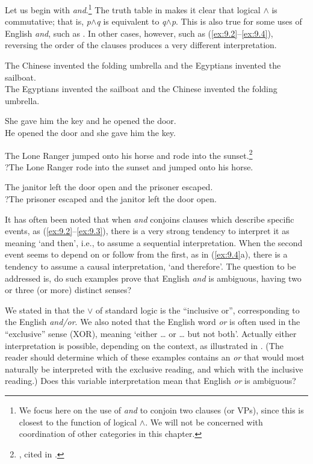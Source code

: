 Let us begin with \textit{and}.\footnote{We focus here on the use of \textit{and} to conjoin two clauses (or VPs), since this is closest to the function of logical $\wedge$. We will not be concerned with coordination of other categories in this chapter.} The truth table in  makes it clear that logical $\wedge$ is commutative; that is, \textit{p$\wedge$}\textit{q} is equivalent to \textit{q$\wedge$}\textit{p}. This is also true for some uses of English \textit{and}, such as . In other cases, however, such as (\ref{ex:9.2}--\ref{ex:9.4}), reversing the order of the clauses produces a very different interpretation.


\ea \label{ex:9.1}
\ea The {Chinese} invented the folding umbrella and the Egyptians invented the sailboat.\\
\ex The Egyptians invented the sailboat and the {Chinese} invented the folding umbrella.
                       \z
\z

\ea \label{ex:9.2}
\ea She gave him the key and he opened the door.\\
\ex He opened the door and she gave him the key.
                       \z
\z

\ea \label{ex:9.3}
\ea The Lone Ranger jumped onto his horse and rode into the sunset.\footnote{\citet[56]{Kempson1975}, cited in \citet{Gazdar1979}.}\\
\ex ?The Lone Ranger rode into the sunset and jumped onto his horse.
                       \z
\z

\ea \label{ex:9.4}
\ea The janitor left the door open and the prisoner escaped.\\
\ex ?The prisoner escaped and the janitor left the door open.
                       \z
\z


It has often been noted that when \textit{and} conjoins clauses which describe specific events, as (\ref{ex:9.2}--\ref{ex:9.3}), there is a very strong tendency to interpret it as meaning ‘and then’, i.e., to assume a sequential interpretation. When the second event seems to depend on or follow from the first, as in (\ref{ex:9.4}a), there is a tendency to assume a causal interpretation, ‘and therefore’. The question to be addressed is, do such examples prove that English \textit{and} is ambiguous, having two or three (or more) distinct senses?



We stated in  that the $\vee$ of standard logic is the “inclusive or”, corresponding to the English \textit{and/or}. We also noted that the English word \textit{or} is often used in the “exclusive” sense (XOR), meaning ‘either … or … but not both’. Actually either interpretation is possible, depending on the context, as illustrated in . (The reader should determine which of these examples contains an \textit{or} that would most naturally be interpreted with the exclusive reading, and which with the inclusive reading.) Does this variable interpretation mean that English \textit{or} is ambiguous? 


